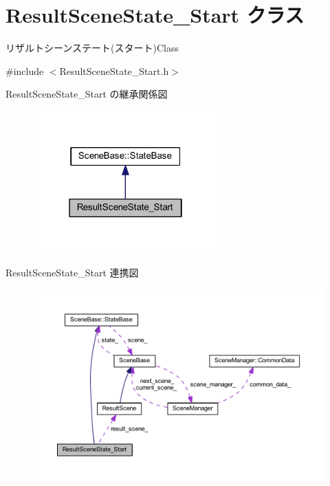 \hypertarget{class_result_scene_state___start}{}\section{Result\+Scene\+State\+\_\+\+Start クラス}
\label{class_result_scene_state___start}


リザルトシーンステート(スタート)Class  




{\ttfamily \#include $<$Result\+Scene\+State\+\_\+\+Start.\+h$>$}



Result\+Scene\+State\+\_\+\+Start の継承関係図
\nopagebreak
\begin{figure}[H]
\begin{center}
\leavevmode
\includegraphics[width=202pt]{class_result_scene_state___start__inherit__graph}
\end{center}
\end{figure}


Result\+Scene\+State\+\_\+\+Start 連携図
\nopagebreak
\begin{figure}[H]
\begin{center}
\leavevmode
\includegraphics[width=350pt]{class_result_scene_state___start__coll__graph}
\end{center}
\end{figure}
